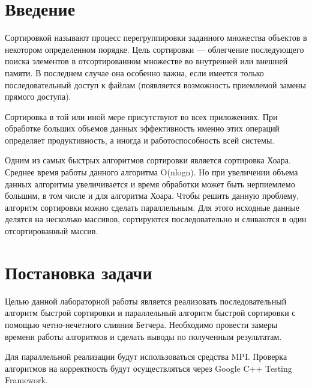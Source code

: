 \documentclass{report}
\begin{document}
\setcounter{page}{2}

\tableofcontents
\newpage

\section*{Введение}
Сортировкой называют процесс перегруппировки заданного множества объектов в некотором определенном порядке. 
Цель сортировки — облегчение последующего поиска элементов в отсортированном множестве во внутренней или внешней памяти. В последнем случае она особенно важна, если имеется только последовательный доступ к файлам (появляется возможность приемлемой замены прямого доступа).
\par Сортировка в той или иной мере присутствуют во всех приложениях. При обработке больших объемов данных эффективность именно этих операций определяет продуктивность, а иногда и работоспособность всей системы.
\par Одним из самых быстрых алгоритмов сортировки является сортировка Хоара. Среднее время работы данного алгоритма O(nlogn).  Но при увеличении объема данных алгоритмы увеличивается и время обработки может быть нерпиемлемо большим, в том числе и для алгоритма Хоара. Чтобы решить данную проблему, алгоритм сортировки можно сделать параллельным. Для этого исходные данные делятся на несколько массивов, сортируются последовательно и сливаются в один отсортированный массив. 
\newpage

\section*{Постановка задачи}
Целью данной лабораторной работы является реализовать последовательный алгоритм быстрой сортировки и параллельный алгоритм быстрой сортировки с помощью четно-нечетного слияния Бетчера.  Необходимо провести замеры времени работы алгоритмов и сделать выводы по полученным результатам.
\par Для параллельной реализации будут использоваться средства MPI. Проверка алгоритмов на корректность будут осуществляться через Google C++ Testing Framework.
\newpage

\end{document}
